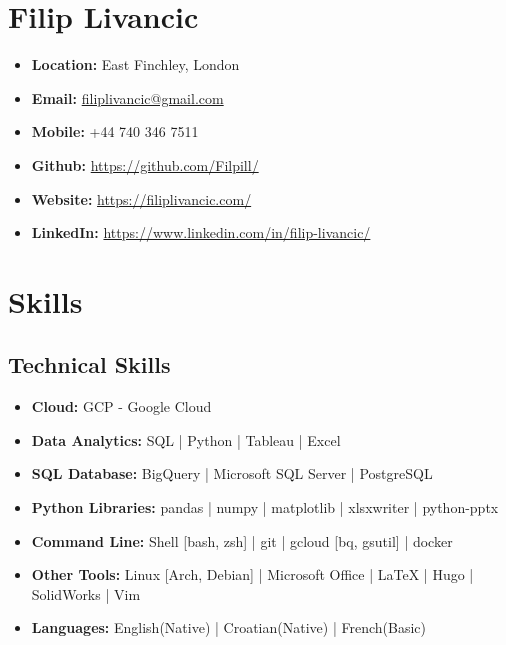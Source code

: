 \documentclass[a4paper,9pt]{article}
\date{}
\begin{document}
\section*{Filip Livancic}

\begin{itemize}[noitemsep]
    \item\textbf{Location: }East Finchley, London
    \item\textbf{Email: }\href{mailto:filiplivancic@gmail.com}{filiplivancic@gmail.com}
    \item\textbf{Mobile: }+44 740 346 7511
    \item\textbf{Github: }\url{https://github.com/Filpill/}
    \item\textbf{Website: }\url{https://filiplivancic.com/}
    \item\textbf{LinkedIn: }\url{https://www.linkedin.com/in/filip-livancic/}
\end{itemize}


\section*{Skills}
\subsection*{Technical Skills}
\begin{itemize}[noitemsep]
    \item \textbf{Cloud:} \hspace{16.9mm} GCP - Google Cloud
    \item \textbf{Data Analytics:} \hspace{3.5mm}  SQL |  Python | Tableau |  Excel
	\item \textbf{SQL Database:} \hspace{4.4mm} BigQuery |  Microsoft SQL Server |  PostgreSQL
    \item \textbf{Python Libraries:} \hspace{0.4mm} pandas | numpy | matplotlib | xlsxwriter | python-pptx
    \item \textbf{Command Line:} \hspace{2.5mm} Shell [bash, zsh] | git |  gcloud [bq, gsutil] | docker
    \item \textbf{Other Tools:} \hspace{8mm}  Linux [Arch, Debian] | Microsoft Office |  LaTeX  | Hugo | SolidWorks | Vim
	\item \textbf{Languages:} \hspace{9.5mm} English(Native) |  Croatian(Native) |  French(Basic)
\end{itemize}
\end{document}
